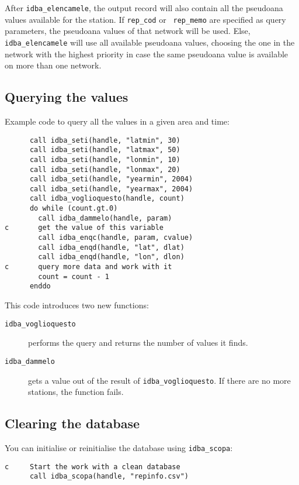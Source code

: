 \documentclass[final,12pt,a4paper,twoside]{book}
\begin{document}
After {\tt idba\_elencamele}, the output record will also contain all the
pseudoana values available for the station.  If {\tt rep\_cod} or {\tt
rep\_memo} are specified as query parameters, the pseudoana values of that
network will be used.  Else, {\tt idba\_elencamele} will use all available
pseudoana values, choosing the one in the network with the highest priority in
case the same pseudoana value is available on more than one network.


\subsection {Querying the values}

Example code to query all the values in a given area and time:
\label{fun-idba_voglioquesto}
\label{fun-idba_dammelo}

\begin{verbatim}
      call idba_seti(handle, "latmin", 30)
      call idba_seti(handle, "latmax", 50)
      call idba_seti(handle, "lonmin", 10)
      call idba_seti(handle, "lonmax", 20)
      call idba_seti(handle, "yearmin", 2004)
      call idba_seti(handle, "yearmax", 2004)
      call idba_voglioquesto(handle, count)
      do while (count.gt.0)
        call idba_dammelo(handle, param)
c       get the value of this variable
        call idba_enqc(handle, param, cvalue)
        call idba_enqd(handle, "lat", dlat)
        call idba_enqd(handle, "lon", dlon)
c       query more data and work with it
        count = count - 1
      enddo
\end{verbatim}
   
This code introduces two new functions:

\begin{description}
\item[{\tt idba\_voglioquesto}]
  performs the query and returns the number of values it finds.
\item[{\tt idba\_dammelo}]
  gets a value out of the result of {\tt idba\_voglioquesto}.  If there are no
  more stations, the function fails.
\end{description}

\subsection {Clearing the database}

You can initialise or reinitialise the database using {\tt idba\_scopa}:
\label{fun-idba_scopa}

\begin{verbatim}
c     Start the work with a clean database
      call idba_scopa(handle, "repinfo.csv")
\end{verbatim}
\end{document}
